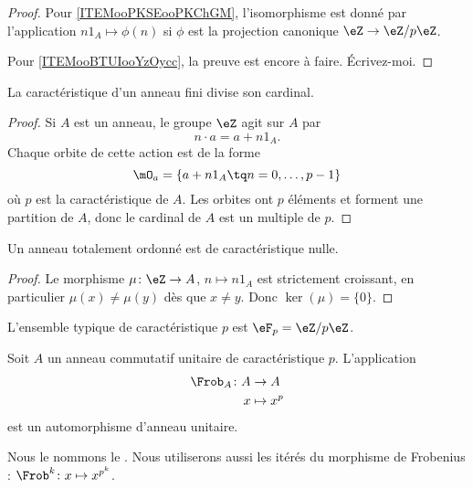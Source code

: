 \begin{proof}
	Pour \ref{ITEMooPKSEooPKChGM}, l'isomorphisme est donné par l'application \( n1_A\mapsto \phi(n)\) si \( \phi\) est la projection canonique \( \eZ\to \eZ/p\eZ\).

	Pour \ref{ITEMooBTUIooYzOycc}, la preuve est encore à faire. Écrivez-moi.
\end{proof}

\begin{proposition}     \label{PropGExaUK}
	La caractéristique d'un anneau fini divise son cardinal.
\end{proposition}

\begin{proof}
	Si \( A\) est un anneau, le groupe \( \eZ\) agit sur \( A\) par
	\begin{equation}
		n\cdot a=a+n1_A.
	\end{equation}
	Chaque orbite de cette action est de la forme
	\begin{equation}
		\mO_a=\{ a+n1_A\tq n=0,\ldots, p-1 \}
	\end{equation}
	où \( p\) est la caractéristique de \( A\). Les orbites ont \( p\) éléments et forment une partition de \( A\), donc le cardinal de \( A\) est un multiple de \( p\).
\end{proof}

\begin{lemma}        \label{LEMooJQIKooQgukqn}
	Un anneau totalement ordonné est de caractéristique nulle.
\end{lemma}

\begin{proof}
	Le morphisme \( \mu\colon \eZ\to A\), \( n\mapsto n 1_A\) est strictement croissant, en particulier \( \mu(x)\neq \mu(y)\) dès que \( x\neq y\). Donc \( \ker(\mu)=\{ 0 \}\).
\end{proof}

L'ensemble typique de caractéristique \( p\) est \( \eF_p=\eZ/p\eZ\).

\begin{proposition} \label{PropFrobHAMkTY}
	Soit \( A\) un anneau commutatif unitaire de caractéristique \( p\). L'application
	\begin{equation}
		\begin{aligned}
			\Frob_A\colon A & \to A       \\
			x               & \mapsto x^p
		\end{aligned}
	\end{equation}
	est un automorphisme d'anneau unitaire.
\end{proposition}
Nous le nommons le . Nous utiliserons aussi les itérés du morphisme de Frobenius : \( \Frob^k\colon x\mapsto x^{p^k}\).

